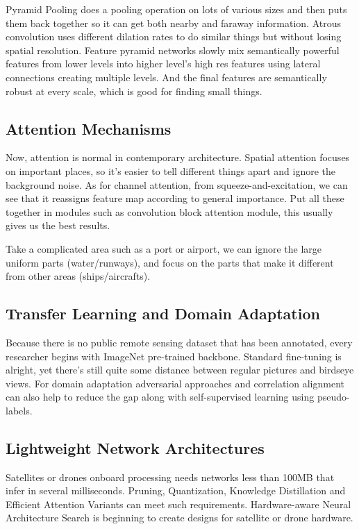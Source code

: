 \documentclass[12pt,a4paper]{article}
\begin{document}
Pyramid Pooling does a pooling operation on lots of various sizes and then puts them back together so it can get both nearby and faraway information. Atrous convolution uses different dilation rates to do similar things but without losing spatial resolution. Feature pyramid networks slowly mix semantically powerful features from lower levels into higher level’s high res features using lateral connections creating multiple levels. And the final features are semantically robust at every scale, which is good for finding small things.

\subsection{Attention Mechanisms}
Now, attention is normal in contemporary architecture. Spatial attention focuses on important places, so it’s easier to tell different things apart and ignore the background noise. As for channel attention, from squeeze-and-excitation, we can see that it reassigns feature map according to general importance. Put all these together in modules such as convolution block attention module, this usually gives us the best results.

Take a complicated area such as a port or airport, we can ignore the large uniform parts (water/runways), and focus on the parts that make it different from other areas (ships/aircrafts).

\subsection{Transfer Learning and Domain Adaptation}
Because there is no public remote sensing dataset that has been annotated, every researcher begins with ImageNet pre-trained backbone. Standard fine-tuning is alright, yet there’s still quite some distance between regular pictures and birdseye views. For domain adaptation adversarial approaches and correlation alignment can also help to reduce the gap along with self-supervised learning using pseudo-labels.

\subsection{Lightweight Network Architectures}
Satellites or drones onboard processing needs networks less than 100MB that infer in several milliseconds. Pruning, Quantization, Knowledge Distillation and Efficient Attention Variants can meet such requirements. Hardware-aware Neural Architecture Search is beginning to create designs for satellite or drone hardware.
\end{document}
